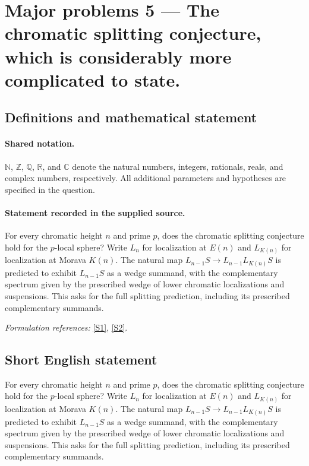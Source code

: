 \documentclass[11pt]{article}
\newcommand{\sref}[2]{\hyperlink{source:#1:#2}{[S#2]}}
\begin{document}
\section{Major problems 5 — The chromatic splitting conjecture, which is considerably more complicated to state.}\label{statement}

\subsection{Definitions and mathematical statement}

\paragraph{Shared notation.}$\mathbb N$, $\mathbb Z$, $\mathbb Q$, $\mathbb R$, and $\mathbb C$ denote the natural numbers, integers, rationals, reals, and complex numbers, respectively. All additional parameters and hypotheses are specified in the question.


\paragraph{Statement recorded in the supplied source.}
For every chromatic height $n$ and prime $p$, does the chromatic splitting conjecture hold for the $p$-local sphere? Write $L_n$ for localization at $E(n)$ and $L_{K(n)}$ for localization at Morava $K(n)$. The natural map $L_{n-1}S\to L_{n-1}L_{K(n)}S$ is predicted to exhibit $L_{n-1}S$ as a wedge summand, with the complementary spectrum given by the prescribed wedge of lower chromatic localizations and suspensions. This asks for the full splitting prediction, including its prescribed complementary summands.
\par\smallskip\textit{Formulation references:} \sref{statement}{1}, \sref{statement}{2}.
\subsection{Short English statement}
For every chromatic height $n$ and prime $p$, does the chromatic splitting conjecture hold for the $p$-local sphere? Write $L_n$ for localization at $E(n)$ and $L_{K(n)}$ for localization at Morava $K(n)$. The natural map $L_{n-1}S\to L_{n-1}L_{K(n)}S$ is predicted to exhibit $L_{n-1}S$ as a wedge summand, with the complementary spectrum given by the prescribed wedge of lower chromatic localizations and suspensions. This asks for the full splitting prediction, including its prescribed complementary summands.
\end{document}
